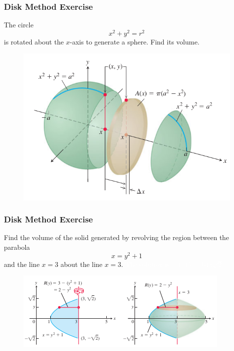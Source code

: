 \documentclass[xcolor=dvipsnames]{beamer}
\begin{document}
\begin{frame}
  \frametitle{Disk Method Exercise}
{\ubung} The circle
\begin{equation}
  \label{eq:ohtooquu}
  x^{2}+y^{2}=r^{2}
\end{equation}
is rotated about the $x$-axis to generate a sphere. Find its volume.
\begin{figure}[h]
  \includegraphics[scale=0.4]{./diagrams/spherevol.png}
\end{figure}
\end{frame}

\begin{frame}
  \frametitle{Disk Method Exercise}
{\ubung} Find the volume of the solid generated by revolving the
region between the parabola 
\begin{equation}
  \label{eq:raejibei}
  x=y^{2}+1
\end{equation}
and the line $x=3$ about the line $x=3$. \textcolor{white}{The solution is $(1/15)\cdot{}64\pi\sqrt{2}$.}
\begin{figure}[h]
  \includegraphics[scale=0.7]{./diagrams/revthr.png}
\end{figure}
\end{frame}

\addtocounter{exercise}{-1}
\addtocounter{equation}{-1}
\end{document}
